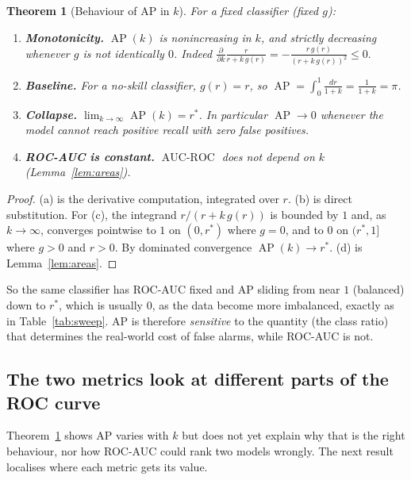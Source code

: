 \documentclass[11pt,a4paper]{article}
\DeclareMathOperator{\AUROC}{AUC\text{-}ROC}
\DeclareMathOperator{\AP}{AP}
\theoremstyle{plain}
\newtheorem{theorem}{Theorem}
\theoremstyle{definition}
\theoremstyle{remark}
\begin{document}
\begin{theorem}[Behaviour of AP in $k$]\label{thm:ap}
For a fixed classifier (fixed $g$):
\begin{enumerate}[label=(\alph*)]
  \item \textbf{Monotonicity.} $\AP(k)$ is nonincreasing in $k$, and strictly decreasing whenever $g$ is not
        identically $0$. Indeed
        $\displaystyle \frac{\partial}{\partial k}\frac{r}{r+k\,g(r)}=-\frac{r\,g(r)}{(r+k\,g(r))^{2}}\le0 .$
  \item \textbf{Baseline.} For a no-skill classifier, $g(r)=r$, so $\AP=\int_0^1\frac{dr}{1+k}=\frac1{1+k}=\pi$.
  \item \textbf{Collapse.} $\displaystyle\lim_{k\to\infty}\AP(k)=r^{*}$. In particular $\AP\to0$ whenever the model
        cannot reach positive recall with zero false positives.
  \item \textbf{ROC-AUC is constant.} $\AUROC$ does not depend on $k$ (Lemma~\ref{lem:areas}).
\end{enumerate}
\end{theorem}
\begin{proof}
(a) is the derivative computation, integrated over $r$. (b) is direct substitution. For (c), the
integrand $r/(r+k\,g(r))$ is bounded by $1$ and, as $k\to\infty$, converges pointwise to $1$ on
$(0,r^{*})$ where $g=0$, and to $0$ on $(r^{*},1]$ where $g>0$ and $r>0$. By dominated convergence
$\AP(k)\to r^{*}$. (d) is Lemma~\ref{lem:areas}.
\end{proof}

So the same classifier has ROC-AUC fixed and AP sliding from near $1$ (balanced) down to $r^{*}$, which is
usually $0$, as the data become more imbalanced, exactly as in Table~\ref{tab:sweep}. AP is therefore
\emph{sensitive} to the quantity (the class ratio) that determines the real-world cost of false
alarms, while ROC-AUC is not.

\subsection{The two metrics look at different parts of the ROC curve}

Theorem~\ref{thm:ap} shows AP varies with $k$ but does not yet explain why that is the right behaviour,
nor how ROC-AUC could rank two models wrongly. The next result localises where each metric gets its
value.
\end{document}
